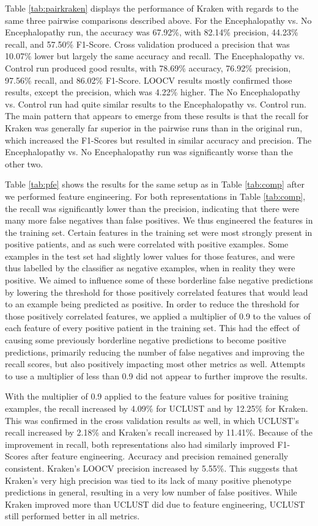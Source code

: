 Table \ref{tab:pairkraken} displays the performance of Kraken with regards to the same three pairwise comparisons described above. For the Encephalopathy vs. No Encephalopathy run, the accuracy was 67.92\%, with 82.14\% precision, 44.23\% recall, and 57.50\% F1-Score. Cross validation produced a precision that was 10.07\% lower but largely the same accuracy and recall. The Encephalopathy vs. Control run produced good results, with 78.69\% accuracy, 76.92\% precision, 97.56\% recall, and 86.02\% F1-Score. LOOCV results mostly confirmed those results, except the precision, which was 4.22\% higher. The No Encephalopathy vs. Control run had quite similar results to the Encephalopathy vs. Control run. The main pattern that appears to emerge from these results is that the recall for Kraken was generally far superior in the pairwise runs than in the original run, which increased the F1-Scores but resulted in similar accuracy and precision. The Encephalopathy vs. No Encephalopathy run was significantly worse than the other two.

Table \ref{tab:pfe} shows the results for the same setup as 
in Table \ref{tab:comp} after we performed feature engineering. For both representations in Table \ref{tab:comp}, the recall was significantly lower than the precision, indicating that there were many more false negatives than false positives. We thus engineered the features in the training set. Certain features in the training set were most strongly present in positive patients, and as such were correlated with positive examples. Some examples in the test set had slightly lower values for those features, and were thus labelled by the classifier as negative examples, when in reality they were positive. We aimed to influence some of these borderline false negative predictions by lowering the threshold for those positively correlated features that would lead to an example being predicted as positive. In order to reduce the threshold for those positively correlated features, we applied a multiplier of 0.9 to the values of each feature of every positive patient in the training set. This had the effect of causing some previously borderline negative predictions to become positive predictions, primarily reducing the number of false negatives and improving the recall scores, but also positively impacting most other metrics as well.  Attempts to use a multiplier of 
less than 0.9 did not appear to further 
improve the results.

With the multiplier of 0.9 applied to the 
feature values for positive training examples, the recall 
increased by 4.09\% for UCLUST and by 12.25\% for Kraken. This was confirmed in the 
cross validation results as well, 
in which UCLUST's recall increased by 2.18\% and 
Kraken's recall increased by 11.41\%. Because of the improvement 
in recall, both representations also had similarly improved F1-Scores after feature engineering. Accuracy and precision remained generally consistent. 
%
Kraken's LOOCV precision 
increased by 5.55\%. This suggests that Kraken's very high precision was tied to its lack of many positive phenotype predictions in general, resulting in a very low number of false positives. While Kraken improved more than UCLUST did due to feature engineering, UCLUST still performed better in all metrics.


